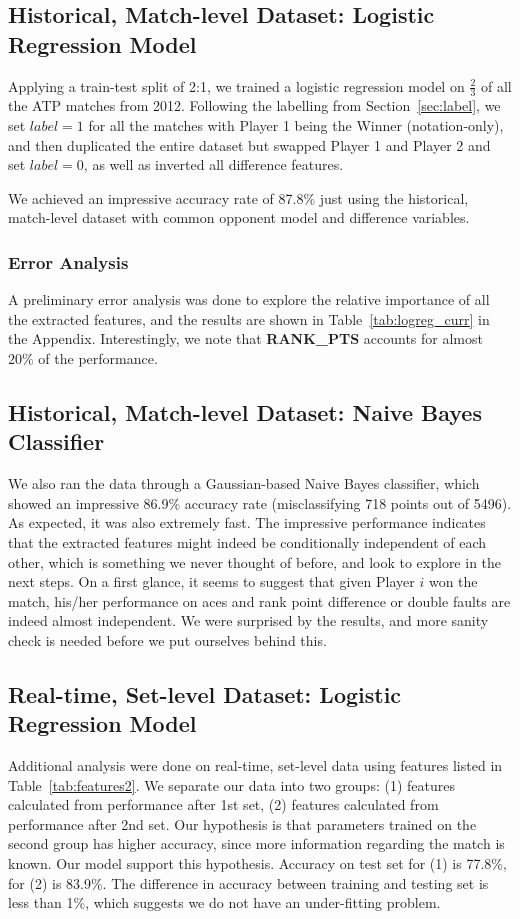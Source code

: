 \documentclass[paper=a4, fontsize=11pt]{scrartcl} %
\numberwithin{equation}{section} %
\numberwithin{figure}{section} %
\numberwithin{table}{section} %
\begin{document}
\subsection{Historical, Match-level Dataset: Logistic Regression Model}
Applying a train-test split of 2:1, we trained a logistic regression model on $\frac{2}{3}$ of all the ATP matches from 2012. Following the labelling from Section~\ref{sec:label}, we set $label = 1$ for all the matches with Player 1 being the Winner (notation-only), and then duplicated the entire dataset but swapped Player 1 and Player 2 and set $label = 0$, as well as inverted all difference features.

We achieved an impressive accuracy rate of 87.8\% just using the historical, match-level dataset with common opponent model and difference variables. 
\subsubsection{Error Analysis}
A preliminary error analysis was done to explore the relative importance of all the extracted features, and the results are shown in Table~\ref{tab:logreg_curr} in the Appendix. Interestingly, we note that \textbf{RANK\_PTS} accounts for almost $20\%$ of the performance. 
\subsection{Historical, Match-level Dataset: Naive Bayes Classifier}
We also ran the data through a Gaussian-based Naive Bayes classifier, which showed an impressive 86.9\% accuracy rate (misclassifying 718 points out of 5496). As expected, it was also extremely fast. The impressive performance indicates that the extracted features might indeed be conditionally independent of each other, which is something we never thought of before, and look to explore in the next steps. On a first glance, it seems to suggest that given Player $i$ won the match, his/her performance on aces and rank point difference or double faults are indeed almost independent. We were surprised by the results, and more sanity check is needed before we put ourselves behind this. 
\subsection{Real-time, Set-level Dataset: Logistic Regression Model}
Additional analysis were done on real-time, set-level data using features listed in Table~\ref{tab:features2}. We separate our data into two groups: (1) features calculated from performance after 1st set, (2) features calculated from performance after 2nd set.  Our hypothesis is that parameters trained on the second group has higher accuracy, since more information regarding the match is known.  Our model support this hypothesis.  Accuracy on test set for (1) is 77.8\%, for (2) is 83.9\%.  The difference in accuracy between training and testing set is less than 1\%, which suggests we do not have an under-fitting problem.
\end{document}
